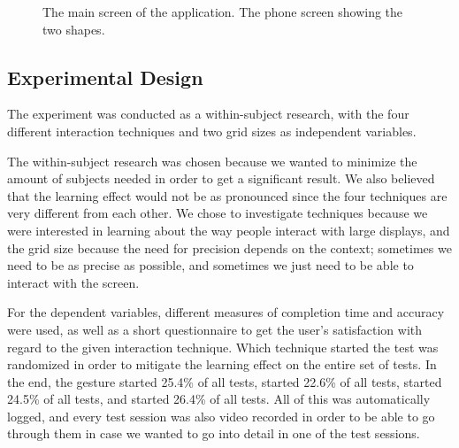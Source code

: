 \begin{figure}[H]
	\centering
	\caption{
		\protect{} The main screen of the application.
		\protect{} The phone screen showing the two shapes.
	}
	\label{fig:allSetup}
\end{figure} 

\subsection{Experimental Design}\label{sec:expdesign}
The experiment was conducted as a within-subject research, with the four different interaction techniques and two grid sizes as independent variables. 

The within-subject research was chosen because we wanted to minimize the amount of subjects needed in order to get a significant result. We also believed that the learning effect would not be as pronounced since the four techniques are very different from each other. 
We chose to investigate techniques because we were interested in learning about the way people interact with large displays, and the grid size because the need for precision depends on the context; sometimes we need to be as precise as possible, and sometimes we just need to be able to interact with the screen. 

For the dependent variables, different measures of completion time and accuracy were used, as well as a short questionnaire to get the user's satisfaction with regard to the given interaction technique. 
Which technique started the test was randomized in order to mitigate the learning effect on the entire set of tests. 
In the end, the \pinch gesture started 25.4\% of all tests, \swipe started 22.6\% of all tests, \throw started 24.5\% of all tests, and \tilt started 26.4\% of all tests. 
All of this was automatically logged, and every test session was also video recorded in order to be able to go through them in case we wanted to go into detail in one of the test sessions.

